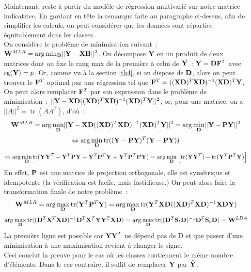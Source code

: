 \documentclass[12pt]{article}
\DeclareMathOperator{\rank}{rg}
\DeclareMathOperator{\trace}{tr}
\begin{document}
Maintenant, reste à partir du modèle de régression multivarié sur notre matrice indicatrice. En gardant en tête la remarque faite au paragraphe ci-dessus, afin de simplifier les calculs, on peut considérer que les données sont réparties équitablement dans les classes. \\
On considère le problème de minimisation suivant~: ${\bf W}^{MLR} = \arg \min_{\bf B} \lvert \lvert {\bf Y} -{\bf X}{\bf B} \rvert \rvert^2$. On décompose ${\bf Y}$ en un produit de deux matrices dont on fixe le rang max de la première à celui de ${\bf Y}$~: ${\bf Y} = {\bf D}{\bf F}^T$ avec $\rank({\bf Y}) = p$. Or, comme vu à la section \ref{th4}, si on dispose de ${\bf D}$, alors on peut trouver le ${\bf F}^T$ optimal par une régression tel que ${\bf F}^T = (({\bf XD})^T {\bf XD})^{-1}({\bf XD})^T{\bf Y}$. On peut alors remplacer ${\bf F}^T$ par son expression dans le problème de minimisation~: $\lvert \lvert {\bf Y} -{\bf X}{\bf D}(({\bf XD})^T {\bf XD})^{-1}({\bf XD})^T{\bf Y} \rvert \rvert^2$, or, pour une matrice, on a $\lvert \lvert A \rvert \rvert^2 = \trace(AA^T)$, d'où~:
$$
{\bf W}^{MLR} = \arg \min_{\bf D} \lvert \lvert {\bf Y} -{\bf X}{\bf D}(({\bf XD})^T {\bf XD})^{-1}({\bf XD})^T{\bf Y} \rvert \rvert^2 = \arg \min_{\bf D} \lvert \lvert {\bf Y} -{\bf P}{\bf Y} \rvert \rvert^2
$$
$$
\Leftrightarrow \arg \min_{\bf D} \trace(({\bf Y} - {\bf PY})^T({\bf Y} - {\bf PY}))
$$
$$
\Leftrightarrow \arg \min_{\bf D} \trace({\bf YY}^T - {\bf Y}^T{\bf PY} - {\bf Y}^T{\bf P}^T{\bf Y} + {\bf Y}^T{\bf P}^T {\bf PY}) = \arg \min_{\bf D} \left[\trace({\bf YY}^T) - \trace({\bf Y}^T{\bf P}^T{\bf Y}) \right]
$$
En effet, ${\bf P}$ est une matrice de projection orthogonale, elle est symétrique et idempotente (la vérification est facile, mais fastidieuse.) On peut alors faire la transformation finale de notre problème~:
$$
{\bf W}^{MLR} = \arg \max_{\bf D} \trace({\bf Y}^T{\bf P}^T{\bf Y}) = \arg \max_{\bf D} \trace({\bf Y}^T{\bf X}{\bf D}(({\bf XD})^T {\bf XD})^{-1}{\bf XD}{\bf Y})
$$
$$
\arg \max_{\bf D} \trace(({\bf D}^T {\bf X}^T{\bf XD})^{-1}{\bf D}^T{\bf X}^T{\bf Y}{\bf Y}^T{\bf X}{\bf D}) = \arg \max_{\bf D} \trace(({\bf D}^T{\bf S}_t{\bf D})^{-1}{\bf D}^T{\bf S}_b{\bf D}) = {\bf W}^{LDA}
$$
La première ligne est possible car ${\bf YY}^T$ ne dépend pas de D et que passer d'une minimisation à une maximisation revient à changer le signe.\\
Ceci conclut la preuve pour le cas où les classes contiennent le même nombre d'éléments. Dans le cas contraire, il suffit de remplacer ${\bf Y}$ par $\tilde{\bf Y}$.\\
\end{document}
